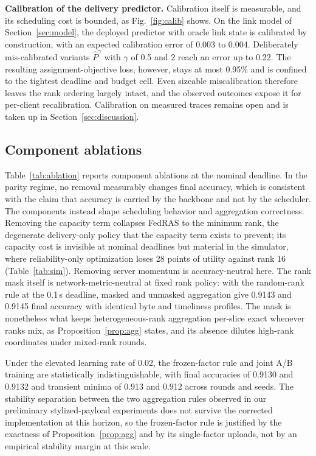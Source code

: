 \documentclass[preprint,12pt]{elsarticle}
\begin{document}
\textbf{Calibration of the delivery predictor.} Calibration itself is measurable, and its scheduling cost is bounded, as Fig.~\ref{fig:calib} shows. On the link model of Section~\ref{sec:model}, the deployed predictor with oracle link state is calibrated by construction, with an expected calibration error of 0.003 to 0.004. Deliberately mis-calibrated variants $\hat P^{\gamma}$ with $\gamma$ of 0.5 and 2 reach an error up to 0.22. The resulting assignment-objective loss, however, stays at most 0.95\% and is confined to the tightest deadline and budget cell. Even sizeable miscalibration therefore leaves the rank ordering largely intact, and the observed outcomes expose it for per-client recalibration. Calibration on measured traces remains open and is taken up in Section~\ref{sec:discussion}.

\subsection{Component ablations}
Table~\ref{tab:ablation} reports component ablations at the nominal deadline. In the parity regime, no removal measurably changes final accuracy, which is consistent with the claim that accuracy is carried by the backbone and not by the scheduler. The components instead shape scheduling behavior and aggregation correctness. Removing the capacity term collapses FedRAS to the minimum rank, the degenerate delivery-only policy that the capacity term exists to prevent; its capacity cost is invisible at nominal deadlines but material in the simulator, where reliability-only optimization loses 28 points of utility against rank 16 (Table~\ref{tab:sim}). Removing server momentum is accuracy-neutral here. The rank mask itself is network-metric-neutral at fixed rank policy: with the random-rank rule at the 0.1\,s deadline, masked and unmasked aggregation give 0.9143 and 0.9145 final accuracy with identical byte and timeliness profiles. The mask is nonetheless what keeps heterogeneous-rank aggregation per-slice exact whenever ranks mix, as Proposition~\ref{prop:agg} states, and its absence dilutes high-rank coordinates under mixed-rank rounds.

Under the elevated learning rate of 0.02, the frozen-factor rule and joint A/B training are statistically indistinguishable, with final accuracies of 0.9130 and 0.9132 and transient minima of 0.913 and 0.912 across rounds and seeds. The stability separation between the two aggregation rules observed in our preliminary stylized-payload experiments does not survive the corrected implementation at this horizon, so the frozen-factor rule is justified by the exactness of Proposition~\ref{prop:agg} and by its single-factor uploads, not by an empirical stability margin at this scale.
\end{document}
